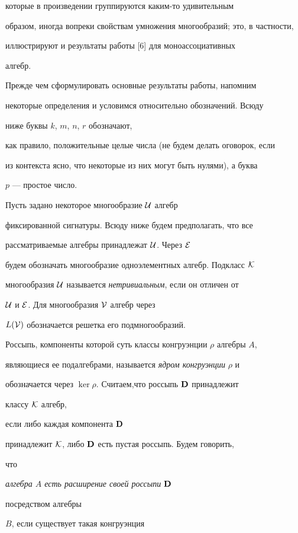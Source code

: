 которые в произведении группируются каким-то удивительным


образом, иногда вопреки свойствам умножения многообразий; это, в частности,


иллюстрируют и результаты работы [6] для моноассоциативных


алгебр.





Прежде чем сформулировать основные результаты работы, напомним


некоторые определения и условимся относительно обозначений. Всюду


ниже буквы $k$, $m$, $n$, $r$ обозначают,


как правило, положительные целые числа (не будем делать оговорок, если


из контекста ясно, что некоторые из них могут быть нулями), а буква


$p$ --- простое число.





Пусть задано некоторое многообразие ${\cal U}$ алгебр


фиксированной сигнатуры. Всюду ниже будем предполагать, что все


рассматриваемые алгебры принадлежат ${\cal U}$. Через ${\cal E}$


будем обозначать многообразие одноэлементных алгебр. Подкласс ${\cal K}$


многообразия ${\cal U}$ называется {\it нетривиальным}, если он отличен от


${\cal U}$ и ${\cal E}$. Для многообразия ${\cal V}$ алгебр через


$L({\cal V})$ обозначается решетка его подмногообразий.





Россыпь, компоненты которой суть классы конгруэнции $\rho$ алгебры $A$,


являющиеся ее подалгебрами, называется {\it ядром конгруэнции} $\rho$ и


обозначается через $\ker\rho$. Считаем,что россыпь ${\bold D}$ принадлежит


классу ${\cal K}$ алгебр,


если либо каждая компонента ${\bold D}$


принадлежит ${\cal K}$, либо ${\bold D}$ есть пустая россыпь. Будем говорить,


что {\it алгебра $A$ есть расширение своей россыпи ${\bold D}$


посредством алгебры} $B$, если существует такая конгруэнция


